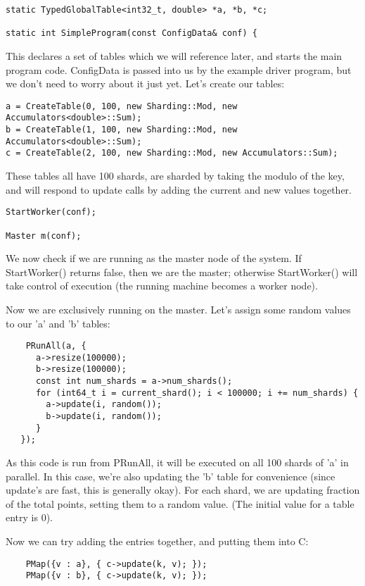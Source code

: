 \documentclass[10pt]{article}
\begin{document}
\begin{lstlisting}
static TypedGlobalTable<int32_t, double> *a, *b, *c;

static int SimpleProgram(const ConfigData& conf) {
\end{lstlisting} 

This declares a set of tables which we will reference later, and starts the main
program code. {\ttfamily ConfigData} is passed into us by the example driver
program, but we don't need to worry about it just yet.  Let's create our tables:

\begin{lstlisting}
a = CreateTable(0, 100, new Sharding::Mod, new Accumulators<double>::Sum);
b = CreateTable(1, 100, new Sharding::Mod, new Accumulators<double>::Sum);
c = CreateTable(2, 100, new Sharding::Mod, new Accumulators::Sum);
\end{lstlisting}

These tables all have 100 shards, are sharded by taking the modulo of the key,
and will respond to update calls by adding the current and new values together.

\begin{lstlisting}
StartWorker(conf);

Master m(conf);
\end{lstlisting}

We now check if we are running as the master node of the system.  If
StartWorker() returns false, then we are the master; otherwise StartWorker()
will take control of execution (the running machine becomes a worker node).

Now we are exclusively running on the master.  Let's assign some random values
to our 'a' and 'b' tables:
\begin{lstlisting}
    PRunAll(a, {
      a->resize(100000);
      b->resize(100000);
      const int num_shards = a->num_shards();
      for (int64_t i = current_shard(); i < 100000; i += num_shards) {
        a->update(i, random());
        b->update(i, random()); 
      }      
   });
\end{lstlisting}

As this code is run from PRunAll, it will be executed on all 100 shards of 'a'
in parallel.  In this case, we're also updating the 'b' table for convenience
(since update's are fast, this is generally okay).  For each shard, we are
updating fraction of the total points, setting them to a random value.  (The
initial value for a table entry is 0).

Now we can try adding the entries together, and putting them into C:
\begin{lstlisting}
    PMap({v : a}, { c->update(k, v); });
    PMap({v : b}, { c->update(k, v); });
\end{lstlisting}
\end{document}
